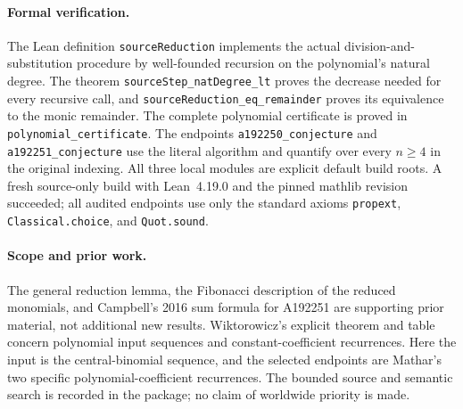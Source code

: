\paragraph{Formal verification.}
The Lean definition \texttt{sourceReduction} implements the actual
division-and-substitution procedure by well-founded recursion on the
polynomial's natural degree. The theorem
\texttt{sourceStep\_natDegree\_lt} proves the decrease needed for every
recursive call, and \texttt{sourceReduction\_eq\_remainder} proves its
equivalence to the monic remainder. The complete polynomial certificate
is proved in \texttt{polynomial\_certificate}. The endpoints
\texttt{a192250\_conjecture} and \texttt{a192251\_conjecture} use the
literal algorithm and quantify over every $n\geq4$ in the original
indexing. All three local modules are explicit default build roots.
A fresh source-only build with Lean~4.19.0 and the pinned mathlib revision
succeeded; all audited endpoints use only the standard axioms
\texttt{propext}, \texttt{Classical.choice}, and \texttt{Quot.sound}.

\paragraph{Scope and prior work.}
The general reduction lemma, the Fibonacci description of the reduced
monomials, and Campbell's 2016 sum formula for A192251 are supporting
prior material, not additional new results. Wiktorowicz's explicit
theorem and table concern polynomial input sequences and
constant-coefficient recurrences. Here the input is the central-binomial
sequence, and the selected endpoints are Mathar's two specific
polynomial-coefficient recurrences. The bounded source and semantic
search is recorded in the package; no claim of worldwide priority is
made.
